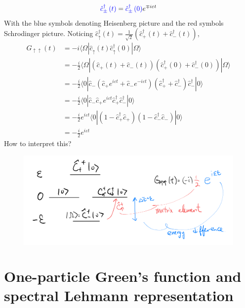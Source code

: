 \[ {\color{blue} \hat{c}_{\pm}^{\dagger}\left( t \right) }={\color{blue} \hat{c}_{\pm}^{\dagger}\left( 0 \right) }e^{\mp i\varepsilon t}\]
With the blue symbols denoting Heisenberg picture and the red symbols Schrodinger picture. Noticing $\hat{c}_{\uparrow}^{\dagger}\left( t \right) =\frac{1}{\sqrt{2}}\left( \hat{c}_{+}^{\dagger}\left( t \right) +\hat{c}_{-}^{\dagger}\left( t \right) \right)$,
\begin{align*}
    G_{\uparrow \uparrow}\left( t \right) &=-i\langle \Omega |\hat{c}_{\uparrow}\left( t \right) \hat{c}_{\uparrow}^{\dagger}\left( 0 \right) |\Omega \rangle \\
    &=-\frac{i}{2}\langle \Omega |\left( \hat{c}_+\left( t \right) +\hat{c}_-\left( t \right) \right) \left( \hat{c}_{+}^{\dagger}\left( 0 \right) +\hat{c}_{-}^{\dagger}\left( 0 \right) \right) |\Omega \rangle \\
    &=-\frac{i}{2}\langle 0|\hat{c}_-\left( \hat{c}_+e^{i\varepsilon t}+\hat{c}_-e^{-i\varepsilon t} \right) \left( \hat{c}_{+}^{\dagger}+\hat{c}_{-}^{\dagger} \right) \hat{c}_{-}^{\dagger}|0\rangle \\
    &=-\frac{i}{2}\langle 0|\hat{c}_-\hat{c}_+e^{i\varepsilon t}\hat{c}_{+}^{\dagger}\hat{c}_{-}^{\dagger}|0\rangle \\
    &=-\frac{i}{2}e^{i\varepsilon t}\langle 0|\left( 1-\hat{c}_{+}^{\dagger}\hat{c}_+ \right) \left( 1-\hat{c}_{-}^{\dagger}\hat{c}_- \right) |0\rangle \\
    &=-\frac{i}{2}e^{i\varepsilon t}
\end{align*}
How to interpret this?
\begin{figure}[h]
    \centering
    \includegraphics[width=\textwidth]{jupyterbook/data/fig/lec04-fig02.png}
\end{figure}

\section{One-particle Green's function and spectral Lehmann representation}

